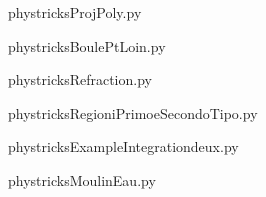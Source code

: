     \newcommand{\CaptionFigProjPoly}{<+Type your caption here+>}
    \begin{center}
        
    \end{center}
    phystricksProjPoly.py

    

    \clearpage
    


    \newcommand{\CaptionFigBoulePtLoin}{<+Type your caption here+>}
    \begin{center}
        
    \end{center}
    phystricksBoulePtLoin.py

    

    \clearpage
    


    \newcommand{\CaptionFigRefraction}{<+Type your caption here+>}
    \begin{center}
        
    \end{center}
    phystricksRefraction.py

    

    \clearpage
    


    \newcommand{\CaptionFigRegioniPrimoeSecondoTipo}{<+Type your caption here+>}
    \begin{center}
        
    \end{center}
    phystricksRegioniPrimoeSecondoTipo.py

    

    \clearpage
    


    \newcommand{\CaptionFigExampleIntegrationdeux}{<+Type your caption here+>}
    \begin{center}
        
    \end{center}
    phystricksExampleIntegrationdeux.py

    

    \clearpage
    


    \newcommand{\CaptionFigMoulinEau}{<+Type your caption here+>}
    \begin{center}
        
    \end{center}
    phystricksMoulinEau.py

